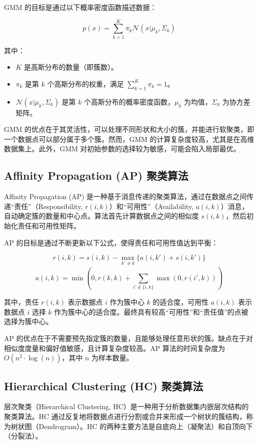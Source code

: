 \documentclass{ctexart} %
\begin{document}
GMM 的目标是通过以下概率密度函数描述数据：

\[
p(x) = \sum_{k=1}^{K} \pi_k \mathcal{N}(x | \mu_k, \Sigma_k)
\]

其中：
\begin{itemize}
    \item \( K \) 是高斯分布的数量（即簇数）。
    \item \( \pi_k \) 是第 \( k \) 个高斯分布的权重，满足 \(\sum_{k=1}^{K} \pi_k = 1\)。
    \item \( \mathcal{N}(x | \mu_k, \Sigma_k) \) 是第 \( k \) 个高斯分布的概率密度函数，\(\mu_k\) 为均值，\(\Sigma_k\) 为协方差矩阵。
\end{itemize}

GMM 的优点在于其灵活性，可以处理不同形状和大小的簇，并能进行软聚类，即一个数据点可以部分属于多个簇。然而，GMM 的计算复杂度较高，尤其是在高维数据集上。此外，GMM 对初始参数的选择较为敏感，可能会陷入局部最优。

\subsection{Affinity Propagation (AP) 聚类算法}

Affinity Propagation (AP) 是一种基于消息传递的聚类算法，通过在数据点之间传递“责任”（Responsibility, \(r(i, k)\)）和“可用性”（Availability, \(a(i, k)\)）消息，自动确定簇的数量和中心点。算法首先计算数据点之间的相似度 \(s(i, k)\)，然后初始化责任和可用性矩阵。

AP 的目标是通过不断更新以下公式，使得责任和可用性值达到平衡：

\[
r(i, k) = s(i, k) - \max_{k' \neq k} \{a(i, k') + s(i, k')\}
\]
\[
a(i, k) = \min\left(0, r(k, k) + \sum_{i' \notin \{i, k\}} \max(0, r(i', k))\right)
\]

其中，责任 \(r(i, k)\) 表示数据点 \(i\) 作为簇中心 \(k\) 的适合度，可用性 \(a(i, k)\) 表示数据点 \(i\) 选择 \(k\) 作为簇中心的适合度。最终具有较高“可用性”和“责任值”的点被选择为簇中心。

AP 的优点在于不需要预先指定簇的数量，且能够处理任意形状的簇。缺点在于对相似度度量和偏好值敏感，且计算复杂度较高。AP 算法的时间复杂度为 \(O(n^2 \cdot \log(n))\)，其中 \(n\) 为样本数量。

\subsection{Hierarchical Clustering (HC) 聚类算法}

层次聚类（Hierarchical Clustering, HC）是一种用于分析数据集内嵌层次结构的聚类算法。HC 通过反复地将数据点进行分割或合并来形成一个树状的簇结构，称为树状图（Dendrogram）。HC 的两种主要方法是自底向上（凝聚法）和自顶向下（分裂法）。
\end{document}
